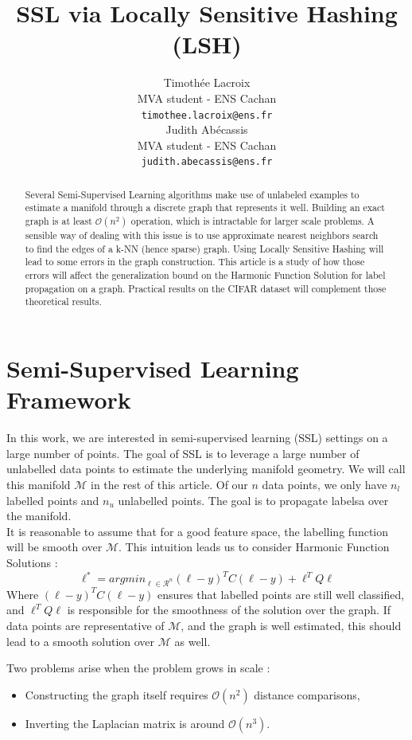 \documentclass{article} %
\title{SSL via Locally Sensitive Hashing (LSH)}
\author{
Timothée Lacroix \\
MVA student - ENS Cachan\\
\texttt{timothee.lacroix@ens.fr} \\
\And
Judith Abécassis \\
MVA student - ENS Cachan \\
\texttt{judith.abecassis@ens.fr} \\
}
\begin{document}
\maketitle

\begin{abstract}
Several Semi-Supervised Learning algorithms make use of unlabeled examples to estimate a manifold through a discrete graph that represents it well. Building an exact graph is at least $\mathcal{O}(n^2)$ operation, which is intractable for larger scale problems. A sensible way of dealing with this issue is to use approximate nearest neighbors search to find the edges of a k-NN (hence sparse) graph. Using Locally Sensitive Hashing will lead to some errors in the graph construction. This article is a study of how those errors will affect the generalization bound on the Harmonic Function Solution for label propagation on a graph. Practical results on the CIFAR dataset will complement those theoretical results.
\end{abstract}


\section{Semi-Supervised Learning Framework}
In this work, we are interested in semi-supervised learning (SSL) settings on a large number of points. The goal of SSL is to leverage a large number of unlabelled data points to estimate the underlying manifold geometry. We will call this manifold $\mathcal{M}$ in the rest of this article. Of our $n$ data points, we only have $n_l$ labelled points and $n_u$ unlabelled points. The goal is to propagate labelsa over the manifold.\\
It is reasonable to assume that for a good feature space, the labelling function will be smooth over $\mathcal{M}$. This intuition leads us to consider Harmonic Function Solutions : 
$$\ell^* = argmin_{\ell \in \mathcal{R}^n} (\ell-y)^TC(\ell-y) + \ell^TQ\ell$$
Where $(\ell-y)^TC(\ell-y)$ ensures that labelled points are still well classified, and $\ell^TQ\ell$ is responsible for the smoothness of the solution over the graph. If data points are representative of $\mathcal{M}$, and the graph is well estimated, this should lead to a smooth solution over $\mathcal{M}$ as well. 

Two problems arise when the problem grows in scale :
\begin{itemize}
\item Constructing the graph itself requires $\mathcal{O}(n^2)$ distance comparisons,
\item Inverting the Laplacian matrix is around $\mathcal{O}(n^3)$.
\end{itemize}
\end{document}
